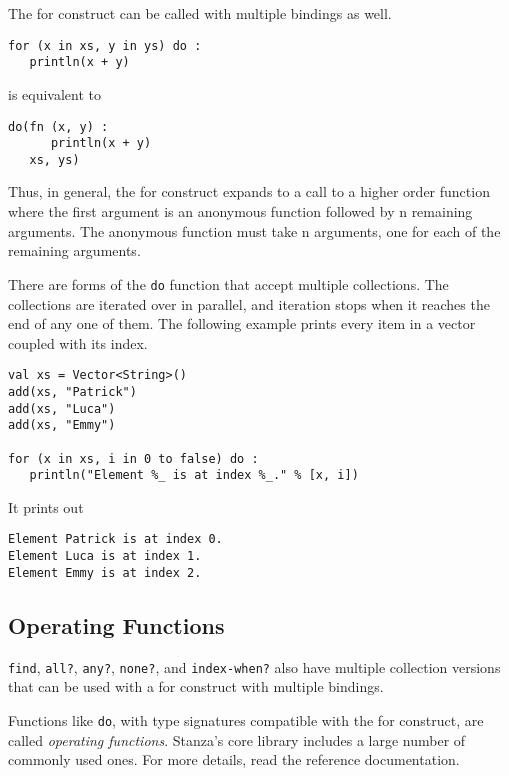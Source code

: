 \documentclass[10pt,oneside]{book}
\begin{document}
The for construct can be called with multiple bindings as well.
\begin{lstlisting}
for (x in xs, y in ys) do :
   println(x + y)
\end{lstlisting}
is equivalent to
\begin{lstlisting}
do(fn (x, y) :
      println(x + y)
   xs, ys)   
\end{lstlisting}

Thus, in general, the for construct expands to a call to a higher order function where the first argument is an anonymous function followed by n remaining arguments. The anonymous function must take n arguments, one for each of the remaining arguments.

There are forms of the \texttt{\frenchspacing do} function that accept multiple collections. The collections are iterated over in parallel, and iteration stops when it reaches the end of any one of them. The following example prints every item in a vector coupled with its index. 
\begin{lstlisting}
val xs = Vector<String>()
add(xs, "Patrick")
add(xs, "Luca")
add(xs, "Emmy")

for (x in xs, i in 0 to false) do :
   println("Element %_ is at index %_." % [x, i])
\end{lstlisting}
It prints out 
\begin{lstlisting}
Element Patrick is at index 0.
Element Luca is at index 1.
Element Emmy is at index 2.
\end{lstlisting}

\subsection*{Operating Functions}
\texttt{\frenchspacing find}, \texttt{\frenchspacing all?}, \texttt{\frenchspacing any?}, \texttt{\frenchspacing none?}, and \texttt{\frenchspacing index-when?} also have multiple collection versions that can be used with a for construct with multiple bindings.

Functions like \texttt{\frenchspacing do}, with type signatures compatible with the for construct, are called {\em operating functions}. Stanza's core library includes a large number of commonly used ones. For more details, read the reference documentation. 
\end{document}
